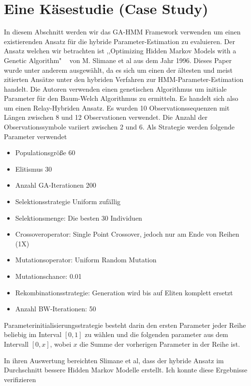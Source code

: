 \section*{Eine Käsestudie (Case Study)}
In diesem Abschnitt werden wir das GA-HMM Framework verwenden um einen existierenden Ansatz für die hybride Parameter-Estimation zu evaluieren. Der Ansatz welchen wir betrachten ist ,,Optimizing Hidden Markov Models with a Genetic Algorithm" ~\cite*{LiteratureEvalGASlimane} von M. Slimane et al aus dem Jahr 1996. Dieses Paper wurde unter anderem ausgewählt, da es sich um einen der ältesten und meist zitierten Ansätze unter den hybriden Verfahren zur HMM-Parameter-Estimation handelt. Die Autoren verwenden einen genetischen Algorithmus um initiale Parameter für den Baum-Welch Algorithmus zu ermitteln. Es handelt sich also um einen Relay-Hybriden Ansatz. Es wurden 10 Observationssequenzen mit Längen zwischen 8 und 12 Observationen verwendet. Die Anzahl der Observationssymbole variiert zwischen 2 und 6.
Als Strategie werden folgende Parameter verwendet
\begin{itemize}
    \item Populationsgröße 60
    \item Elitismus 30
    \item Anzahl GA-Iterationen 200
    \item Selektionsstrategie Uniform zufällig
    \item Selektionsmenge: Die besten 30 Individuen
    \item Crossoveroperator: Single Point Crossover, jedoch nur am Ende von Reihen (1X)
    \item Mutationsoperator: Uniform Random Mutation
    \item Mutationschance: 0.01
    \item Rekombinationsstrategie: Generation wird bis auf Eliten komplett ersetzt
    \item Anzahl BW-Iterationen: 50
\end{itemize}
Parameterinitialisierungsstrategie besteht darin den ersten Parameter jeder Reihe beliebig im Interval $[0,1]$ zu wählen und die folgenden parameter aus dem Intervall $[0,x]$, wobei $x$ die Summe der vorherigen Parameter in der Reihe ist.

In ihren Auswertung bereichten Slimane et al, dass der hybride Ansatz im Durchschnitt bessere Hidden Markov Modelle erstellt. 
Ich konnte diese Ergebnisse verifizieren

